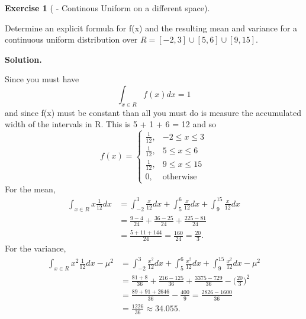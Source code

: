 \documentclass[10pt,]{book}
\theoremstyle{plain}
\theoremstyle{definition}
\theoremstyle{definition}
\theoremstyle{definition}
\newtheorem{exercise}[theorem]{Exercise}
\numberwithin{equation}{section}
\begin{document}
\begin{exercise}[{ - Continous Uniform on a different space}]\label{exercise-36}

Determine an explicit formula for f(x) and the resulting mean and variance for a continuous uniform distribution over \(R = [-2,3] \cup [5,6] \cup [9,15]\).
%
\par\smallskip
\noindent\textbf{Solution.}\hypertarget{solution-10}{}\quad

Since you must have 
\begin{equation*}\int_{x \in R} f(x) dx = 1\end{equation*}
and since f(x) must be constant than all you must do is measure the accumulated width of the intervals in R. This is 5 + 1 + 6 = 12 and so
\begin{equation*}
f(x)=\left\{\begin{matrix}
 \frac{1}{12}, & -2 \le x \le 3
\\ \frac{1}{12}, & 5 \le x \le 6
\\ \frac{1}{12}, & 9 \le x \le 15
\\ 0, & \text{otherwise}
\end{matrix}\right.
\end{equation*}
For the mean, 
	\begin{align*}
\int_{x \in R} x \frac{1}{12} dx & = \int_{-2}^3 \frac{x}{12} dx + \int_5^6 \frac{x}{12} dx + \int_9^{15} \frac{x}{12} dx\\
 & = \frac{9-4}{24} + \frac{36-25}{24} + \frac{225-81}{24}\\
 & = \frac{5+11+144}{24} = \frac{160}{24} = \frac{20}{3}.
\end{align*}
For the variance,
	\begin{align*}
\int_{x \in R} x^2 \frac{1}{12} dx - \mu^2 & = \int_{-2}^3 \frac{x^2}{12} dx + \int_5^6 \frac{x^2}{12} dx + \int_9^{15} \frac{x^2}{12} dx - \mu^2\\
 & = \frac{81+8}{36} + \frac{216-125}{36} + \frac{3375-729}{36} - \big ( \frac{20}{3} \big )^2\\
 & = \frac{89+91+2646}{36} - \frac{400}{9} = \frac{2826-1600}{36} \\
 & = \frac{1226}{36} \approx	34.055.
\end{align*}
%
\end{exercise}
\end{document}
